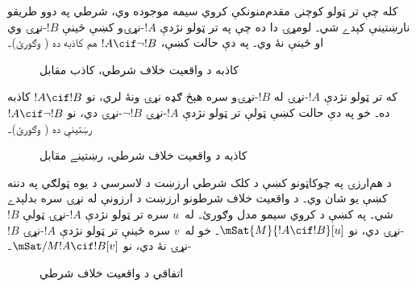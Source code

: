 \documentclass[../../../include/open-logic-section]{subfiles}
\begin{document}
کله چې تر ټولو کوچنۍ مقدم‌منونکې کروي سيمه موجوده وي،
شرطي په دوو طريقو نارښتينې کېدے شي۔ لومړۍ دا ده چې په تر
ټولو نژدې $!A$-نړۍو کښې ځينې $!B$-نړۍ وي او ځينې نۀ وي۔ په دې
حالت کښې، $!A \cif
\lnot !B$ هم کاذبه ده ( وګورئ)۔
\begin{figure}
\begin{center}
\caption{کاذبه د واقعيت خلاف شرطي، کاذب مقابل}
\end{center}
\end{figure}
که تر ټولو نژدې $!A$-نړۍ له $!B$-نړۍو سره هېڅ ګډه نړۍ
ونۀ لري، نو $!A \cif !B$ کاذبه ده۔ خو په دې حالت کښې ټولې
تر ټولو نژدې $!A$-نړۍ $\lnot !B$-نړۍ دي، نو
$!A \cif \lnot !B$ رښتينې ده ( وګورئ)۔
\begin{figure}
\begin{center}
\caption{کاذبه د واقعيت خلاف شرطي، رښتينے مقابل}
\end{center}
\end{figure}

د هم‌ارزۍ په چوکاټونو کښې د کلک شرطي ارزښت د لاسرسي
د يوه ټولګي په دننه کښې يو شان وي۔ د واقعيت خلاف شرطونو
ارزښت د ارزونې له نړۍ سره بدلېدے شي۔
په  کښې د کروي سيمو مدل وګورئ۔
له~$u$ سره تر ټولو نژدې $!A$-نړۍ ټولې $!B$-نړۍ دي، نو
$\mSat{M}{!A \cif
  !B}[u]$۔ خو له~$v$ سره ځينې تر ټولو نژدې $!A$-نړۍ
$!B$-نړۍ نۀ دي، نو $\mSat/{M}{!A \cif !B}[v]$۔
\begin{figure}
\begin{center}
\end{center}
\caption{اتفاقي د واقعيت خلاف شرطي}
\end{figure}
\end{document}
